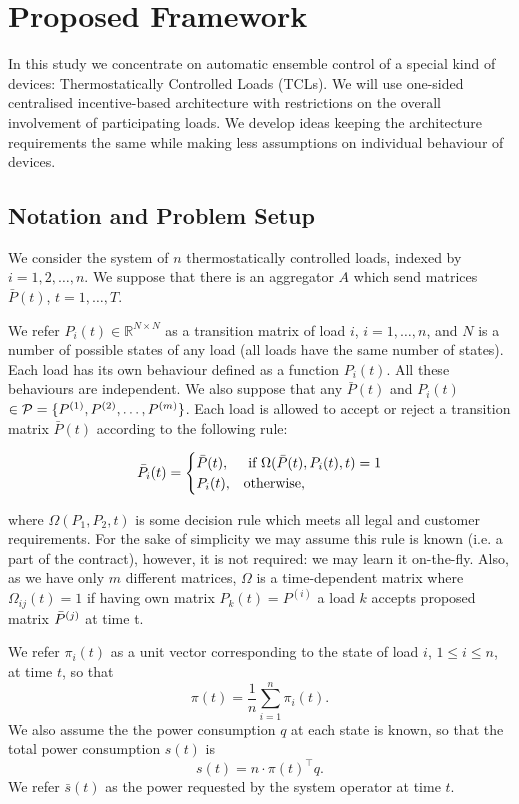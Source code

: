 \chapter{Proposed Framework}
In this study we concentrate on automatic ensemble control of a special kind of devices: Thermostatically Controlled Loads (TCLs). We will use one-sided centralised incentive-based architecture with restrictions on the overall involvement of participating loads. We develop \cite{Chertkov2017} ideas keeping the architecture requirements the same while making less assumptions on individual behaviour of devices. 





\section{Notation and Problem Setup} We consider the system of $n$ thermostatically controlled loads, indexed by $i = 1, 2, \dots, n$. We suppose that there is an aggregator $A$ which send matrices ${\bar P}(t)$, $t=1, \dots, T$.

We refer $P_i(t) \in \mathbb{R}^{N\times N}$ as a transition matrix of load $i$, $i = 1, \dots, n$, and $N$ is a number of possible states of any load (all loads have the same number of states). Each load has its own behaviour defined as a function $P_i(t)$. All these behaviours are independent. We also suppose that any ${\bar P}(t)$ and $P_{i}(t)$  $\in {\cal P} = \{P^{(1)}, P^{(2)}, \dots, P^{(m)}\}$. Each load is allowed to accept or reject a transition matrix ${\bar P}(t)$ according to the following rule: 


\[
    {\bar P_i}(t) = 
    \begin{cases}
    {\bar P}(t), & \text{ if } \Omega({\bar P}(t),P_{i}(t), t) = 1\\
    P_i(t), & \text{otherwise},
    \end{cases}
\]

where $\Omega(P_1, P_2, t)$ is some decision rule which meets all legal and customer requirements. For the sake of simplicity we may assume this rule is known (i.e. a part of the contract), however, it is not required: we may learn it on-the-fly. Also, as we have only $m$ different matrices, $\Omega$ is a time-dependent matrix where $\Omega_{ij}(t) = 1$ if having own matrix $P_k(t) = P^{(i)}$ a load $k$ accepts proposed matrix ${\bar P}^{(j)}$ at time t. 


%
We refer $\pi_i(t)$ as a unit vector corresponding to the state of load $i$, $1\le i \le n$, at time $t$, so that 
\[\pi(t) = \frac{1}{n}\sum_{i=1}^n \pi_i(t).\]
We also assume the the power consumption $q$ at each state is known, so that the total power consumption $s(t)$ is 
\[s(t) = n\cdot \pi(t)^\top q.\]
We refer ${\bar s}(t)$ as the power requested by the system operator at time $t$. 

